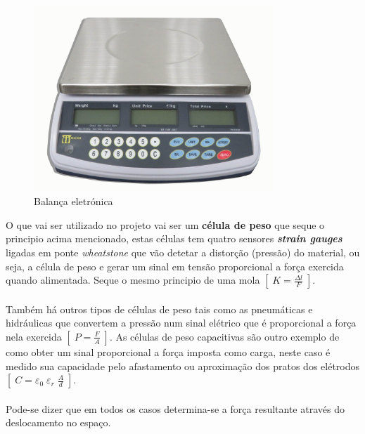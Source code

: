 \begin{figure}[H]
	\centering
	\includegraphics[height=7cm]{./image/PESTA/general/Scale_1.jpg}
	\caption{Balança eletrónica}
	\label{Scale_1}
\end{figure}
O que vai ser utilizado no projeto vai ser um \textbf{célula de peso} que seque o principio acima mencionado, estas células tem quatro sensores \textit{\textbf{strain gauges}} ligadas em ponte \textit{wheatstone} que vão detetar a distorção (pressão) do material, ou seja, a célula de peso e gerar um sinal em tensão proporcional a força exercida quando alimentada. Seque o mesmo principio de uma mola $ [ \; K = \frac{\Delta l}{F} \; ] $.
\\
\\
Também há outros tipos de células de peso tais como as pneumáticas e hidráulicas que convertem a pressão num sinal elétrico que é proporcional a força nela exercida $ [ \; P = \frac{F}{A} \; ] $. As células de peso capacitivas são outro exemplo de como obter um sinal proporcional a força imposta como carga, neste caso é medido sua capacidade pelo afastamento ou aproximação dos pratos dos elétrodos $ [ \; C = \varepsilon_{0} \; \varepsilon_{r} \; \frac{A}{d} \; ] $.
\\
\\
Pode-se dizer que em todos os casos determina-se a força resultante através do deslocamento no espaço.
